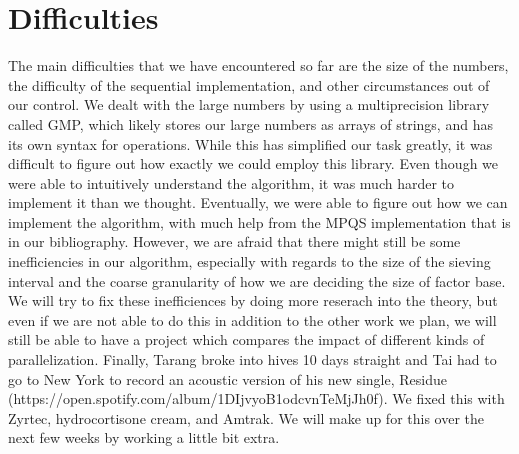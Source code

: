\documentclass[11pt]{article}
\begin{document}
\section {Difficulties}
The main difficulties that we have encountered so far are the size of the numbers, the difficulty of the sequential implementation, and other circumstances out of our control. We dealt with the large numbers by using a multiprecision library called GMP, which likely stores our large numbers as arrays of strings, and has its own syntax for operations. While this has simplified our task greatly, it was difficult to figure out how exactly we could employ this library. Even though we were able to intuitively understand the algorithm, it was much harder to implement it than we thought. Eventually, we were able to figure out how we can implement the algorithm, with much help from the MPQS implementation that is in our bibliography. However, we are afraid that there might still be some inefficiencies in our algorithm, especially with regards to the size of the sieving interval and the coarse granularity of how we are deciding the size of factor base. We will try to fix these inefficiences by doing more reserach into the theory, but even if we are not able to do this in addition to the other work we plan, we will still be able to have a project which compares the impact of different kinds of parallelization. Finally, Tarang broke into hives 10 days straight and Tai had to go to New York to record an acoustic version of his new single, Residue (https://open.spotify.com/album/1DIjvyoB1odcvnTeMjJh0f). We fixed this with  Zyrtec, hydrocortisone cream, and Amtrak. We will make up for this over the next few weeks by working a little bit extra.
\end{document}
